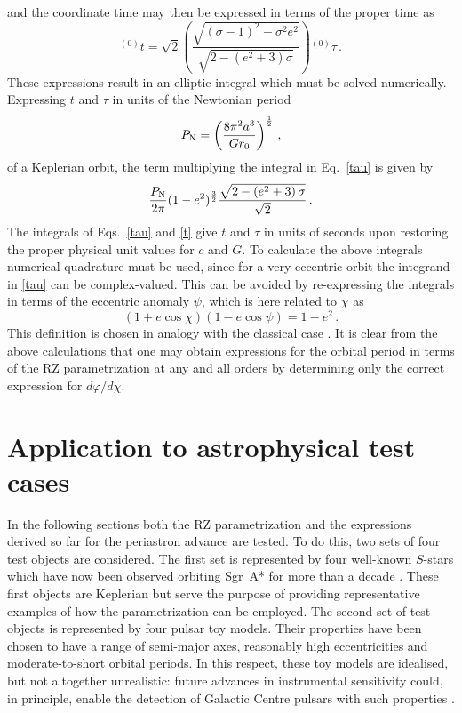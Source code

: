 \documentclass[a4paper,aps,twocolumn,showpacs,showkeys,nofootinbib,preprintnumbers,superscriptaddress,amsmath,amssymb,amsfonts]{revtex4-1}
\begin{document}
%
and the coordinate time may then be expressed in terms of the
proper time as
%
\begin{equation} 
\label{t}
{}^{(0)} t = \sqrt{2} \left( \frac{\sqrt{\left( \sigma - 1 \right)^{2} - \sigma^{2}e^{2}}}
{\sqrt{2 - \left( e^{2} + 3 \right)\sigma}} \right) {}^{(0)}\tau\,.
\end{equation}  
%
These expressions result in an elliptic integral which must be solved
numerically. Expressing $t$ and $\tau$ in units of the Newtonian period
%
\begin{equation} 
\label{PNewton}
P_{\rm N}=\left( \frac{8\pi^2 a^3}{G r_0}\right)^{\frac{1}{2}} \,,
\end{equation}     
%
of a Keplerian orbit, the term multiplying the integral in
Eq.~\eqref{tau} is given by
%
\begin{equation} 
\frac{P_{\rm N}}{2\pi}(1-e^2)^{\frac{3}{2}}
\frac{\sqrt{2-\left(e^2+3\right)\sigma}}{\sqrt{2}} \,.
\end{equation}
%
The integrals of Eqs.~\eqref{tau} and \eqref{t} give $t$ and $\tau$ in
units of seconds upon restoring the proper physical unit values for $c$
and $G$. To calculate the above integrals numerical quadrature must be
used, since for a very eccentric orbit the integrand in \eqref{tau} can
be complex-valued. This can be avoided by re-expressing the integrals in
terms of the eccentric anomaly $\psi$, which is here related to $\chi$ as
%
\begin{equation}
\left(1 + e\cos\chi\right)\left(1 - e\cos\psi\right) = 1 - e^2 \,.
\end{equation}
%
This definition is chosen in analogy with the classical case
\cite{Damour1985,Damour1986}. It is clear from the above calculations
that one may obtain expressions for the orbital period in terms of the RZ
parametrization at any and all orders by determining only the correct
expression for $d\varphi / d\chi$.

\section{Application to astrophysical test cases}
\label{sei}
In the following sections both the
RZ parametrization and the expressions derived so far for the
periastron advance are tested. 
To do this, two sets of four test
objects are considered. 
The first set is represented by four well-known $S$-stars
which have now been observed orbiting
Sgr~A* for more than a decade \cite{Eckart1996, Eckart1997, Gillessen:2009, 
Gillessen2009L,Ghez1998, Ghez:2008}. 
These first objects are Keplerian but serve the purpose of providing representative
examples of how the parametrization can be employed. 
The second set of
test objects is represented by four pulsar toy models. 
Their properties have been chosen to have
a range of semi-major axes, reasonably high eccentricities and 
moderate-to-short orbital periods. 
In this respect, these toy models are idealised, but
not altogether unrealistic: future advances in instrumental sensitivity 
could, in principle, enable the detection of Galactic Centre pulsars with
such properties \cite{Lorimer2012}.
\end{document}
